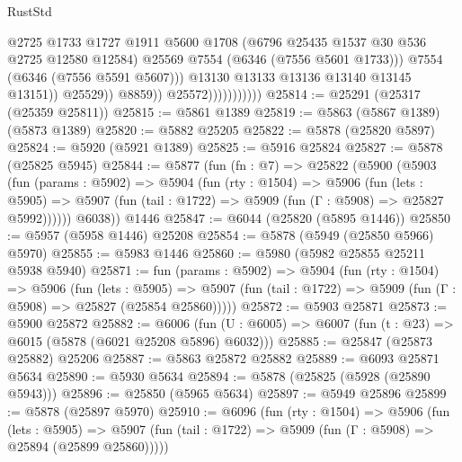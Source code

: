 \begin{lexlean}{RustStd}
\begin{coremodule}
                                          @2725
                                          @1733
                                          @1727
                                          @1911
                                          @5600
                                          @1708
                                          (@6796 @25435 @1537 @30 @536 @2725 @12580 @12584)
                                          @25569
                                          @7554
                                          (@6346 (@7556 @5601 @1733)))
                                        @7554
                                        (@6346 (@7556 @5591 @5607)))
                                      @13130
                                      @13133
                                      @13136
                                      @13140
                                      @13145
                                      @13151))
                                  @25529))
                              @8859))
                          @25572)))))))))))
@25814 := @25291 (@25317 (@25359 @25811))
@25815 := @5861 @1389
@25819 := @5863 (@5867 @1389) (@5873 @1389)
@25820 := @5882 @25205
@25822 := @5878 (@25820 @5897)
@25824 := @5920 (@5921 @1389)
@25825 := @5916 @25824
@25827 := @5878 (@25825 @5945)
@25844 := @5877
    (fun (fn : @7) =>
    @25822
      (@5900
        (@5903
          (fun (params : @5902) =>
          @5904
            (fun (rty : @1504) =>
            @5906
              (fun (lets : @5905) =>
              @5907 (fun (tail : @1722) => @5909 (fun (Γ : @5908) => @25827 @5992))))))
        @6038))
    @1446
@25847 := @6044 (@25820 (@5895 @1446))
@25850 := @5957 (@5958 @1446) @25208
@25854 := @5878 (@5949 (@25850 @5966) @5970)
@25855 := @5983 @1446
@25860 := @5980 (@5982 @25855 @25211 @5938 @5940)
@25871 := fun (params : @5902) =>
  @5904
    (fun (rty : @1504) =>
    @5906
      (fun (lets : @5905) =>
      @5907 (fun (tail : @1722) => @5909 (fun (Γ : @5908) => @25827 (@25854 @25860)))))
@25872 := @5903 @25871
@25873 := @5900 @25872
@25882 := @6006
    (fun (U : @6005) => @6007 (fun (t : @23) => @6015 (@5878 (@6021 @25208 @5896) @6032)))
@25885 := @25847 (@25873 @25882) @25206
@25887 := @5863 @25872 @25882
@25889 := @6093 @25871 @5634
@25890 := @5930 @5634
@25894 := @5878 (@25825 (@5928 (@25890 @5943)))
@25896 := @25850 (@5965 @5634)
@25897 := @5949 @25896
@25899 := @5878 (@25897 @5970)
@25910 := @6096
    (fun (rty : @1504) =>
    @5906
      (fun (lets : @5905) =>
      @5907 (fun (tail : @1722) => @5909 (fun (Γ : @5908) => @25894 (@25899 @25860)))))

\end{coremodule}
\end{lexlean}
